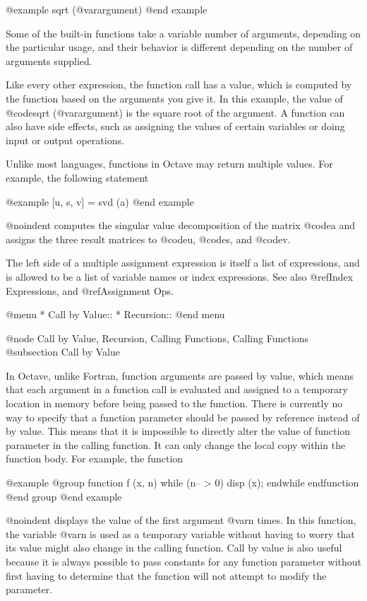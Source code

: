 @example
sqrt (@var{argument})
@end example

Some of the built-in functions take a variable number of arguments,
depending on the particular usage, and their behavior is different
depending on the number of arguments supplied.

Like every other expression, the function call has a value, which is
computed by the function based on the arguments you give it.  In this
example, the value of @code{sqrt (@var{argument})} is the square root of
the argument.  A function can also have side effects, such as assigning
the values of certain variables or doing input or output operations.

Unlike most languages, functions in Octave may return multiple values.
For example, the following statement

@example
[u, s, v] = svd (a)
@end example

@noindent
computes the singular value decomposition of the matrix @code{a} and
assigns the three result matrices to @code{u}, @code{s}, and @code{v}.

The left side of a multiple assignment expression is itself a list of
expressions, and is allowed to be a list of variable names or index
expressions.  See also @ref{Index Expressions}, and @ref{Assignment Ops}.

@menu
* Call by Value::               
* Recursion::                   
@end menu

@node Call by Value, Recursion, Calling Functions, Calling Functions
@subsection Call by Value

In Octave, unlike Fortran, function arguments are passed by value, which
means that each argument in a function call is evaluated and assigned to
a temporary location in memory before being passed to the function.
There is currently no way to specify that a function parameter should be
passed by reference instead of by value.  This means that it is
impossible to directly alter the value of function parameter in the
calling function.  It can only change the local copy within the function
body.  For example, the function

@example
@group
function f (x, n)
  while (n-- > 0)
    disp (x);
  endwhile
endfunction
@end group
@end example

@noindent
displays the value of the first argument @var{n} times.  In this
function, the variable @var{n} is used as a temporary variable without
having to worry that its value might also change in the calling
function.  Call by value is also useful because it is always possible to
pass constants for any function parameter without first having to
determine that the function will not attempt to modify the parameter.

